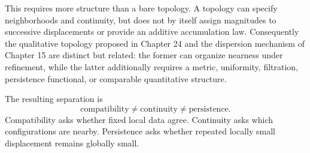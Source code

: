 This requires more structure than a bare topology. A topology can specify neighborhoods and continuity, but does not by itself assign magnitudes to successive displacements or provide an additive accumulation law. Consequently the qualitative topology proposed in Chapter 24 and the dispersion mechanism of Chapter 15 are distinct but related: the former can organize nearness under refinement, while the latter additionally requires a metric, uniformity, filtration, persistence functional, or comparable quantitative structure.

The resulting separation is
\[
\boxed{\text{compatibility}\neq\text{continuity}\neq\text{persistence}.}
\]
Compatibility asks whether fixed local data agree. Continuity asks which configurations are nearby. Persistence asks whether repeated locally small displacement remains globally small.
